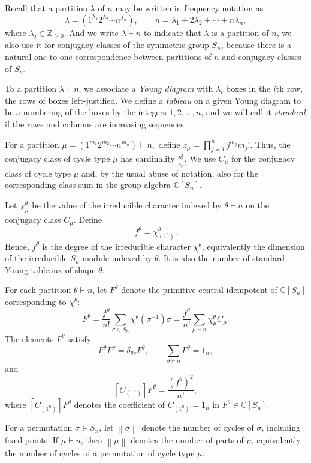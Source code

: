\documentclass[12pt]{article}
\theoremstyle{definition}
\newcommand{\normcycles}[1]{\left\lVert #1\right\rVert}
\begin{document}
Recall that a partition $\lambda$ of $n$ may be written in frequency notation as
\[
\lambda=(1^{\lambda_1}2^{\lambda_2}\cdots n^{\lambda_n}),
\qquad
n=\lambda_1+2\lambda_2+\cdots+n\lambda_n,
\]
where $\lambda_j\in\mathbb{Z}_{\geq 0}$. And we write $\lambda\vdash n$ to indicate that $\lambda$ is a partition of $n$, we also use it for conjugacy classes of the symmetric group $S_n$, because there is a natural one-to-one correspondence between  partitions of $n$ and conjugacy classes of $S_n$.


To a partition $\lambda\vdash n$, we associate a \emph{Young diagram} with $\lambda_i$ boxes in the $i$th row, the rows of boxes left-justified. We define a \emph{tableau} on a given Young diagram to be a numbering of the boxes by the integers $1, 2, \dots, n$, and we will call it \emph{standard} if the rows and columns are increasing sequences.


For a partition
\(
\mu=(1^{m_1}2^{m_2}\cdots n^{m_n})\vdash n,
\)
define
\(
z_\mu=\prod_{j=1}^{n}j^{m_j}m_j!.
\)
Thus, the conjugacy class of cycle type $\mu$ has cardinality
$
\frac{n!}{z_\mu}.
$
We use $C_\mu$ for the conjugacy class of cycle type $\mu$ and, by the usual
abuse of notation, also for the corresponding class sum in the group algebra
$\mathbb{C}[S_n]$.

Let $\chi_\mu^\theta$ be the value of the irreducible character indexed by
$\theta\vdash n$ on the conjugacy class $C_\mu$. Define
\[
f^\theta=\chi_{(1^n)}^\theta.
\]
Hence, $f^\theta$ is the degree of the irreducible character $\chi^\theta$,
equivalently the dimension of the irreducible $S_n$-module indexed by
$\theta$. It is also the number of standard Young tableaux of shape $\theta$.

For each partition $\theta\vdash n$, let $F^\theta$ denote the primitive
central idempotent of $\mathbb{C}[S_n]$ corresponding to $\chi^\theta$:
\[
F^\theta
=
\frac{f^\theta}{n!}
\sum_{\sigma\in S_n}\chi^\theta(\sigma^{-1})\sigma
=
\frac{f^\theta}{n!}
\sum_{\mu\vdash n}\chi_\mu^\theta C_\mu.
\]
The elements $F^\theta$ satisfy
\[
F^\theta F^\nu=\delta_{\theta\nu}F^\theta,
\qquad
\sum_{\theta\vdash n}F^\theta=1_n,
\]
 and
\[
[C_{(1^n)}]F^\theta=\frac{(f^\theta)^2}{n!},
\]
where $[C_{(1^n)}] F^\theta$ denotes the coefficient of
$C_{(1^n)}=1_n$ in $F^\theta \in\mathbb{C}[S_n]$.

For a permutation $\sigma\in S_n$, let $\normcycles{\sigma}$ denote the
number of cycles of $\sigma$, including fixed points. If $\mu\vdash n$, then
$\normcycles{\mu}$ denotes the number of parts of $\mu$, equivalently the
number of cycles of a permutation of cycle type $\mu$.
\end{document}
